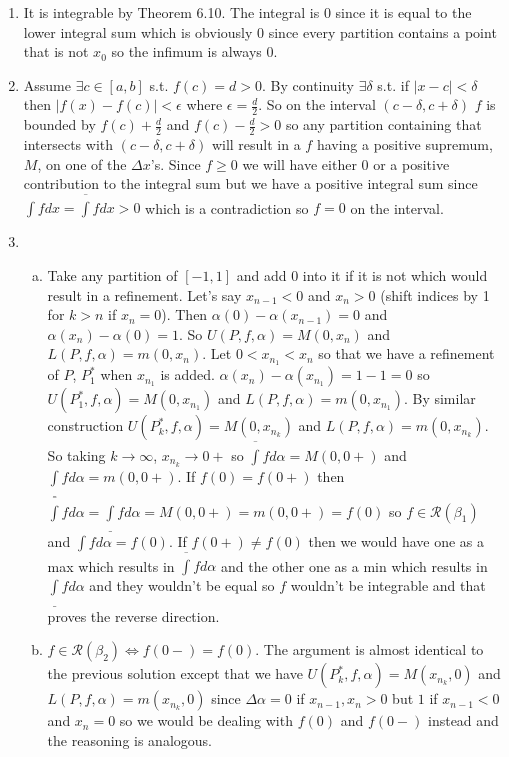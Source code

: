 \documentclass{article}
\begin{document}
\begin{enumerate}
\item It is integrable by Theorem 6.10. The integral is $0$ since it is equal to the lower integral sum which is obviously 0 since every partition contains a point that is not $x_0$ so the infimum is always $0$.
\item Assume $\exists c\in [a, b]$ s.t. $f(c) = d> 0$. By continuity $\exists \delta$ s.t. if $|x-c| < \delta$ then $|f(x)-f(c)| < \epsilon$ where $\epsilon = \frac{d}{2}$. So on the interval $(c-\delta, c+\delta)$ $f$ is bounded by $f(c)+\frac{d}{2}$ and $f(c)-\frac{d}{2} > 0$ so any partition containing that intersects with $(c-\delta, c+\delta)$ will result in a $f$ having a positive supremum, $M$, on one of the $\Delta x$'s. Since $f\geq 0$ we will have either $0$ or a positive contribution to the integral sum but we have a positive integral sum since $\int f dx=\overline{\int} f dx >0$ which is a contradiction so $f = 0$ on the interval. 
\item
\begin{enumerate}[(a)]
\item Take any partition of $[-1, 1]$ and add $0$ into it if it is not which would result in a refinement. Let's say $x_{n-1} < 0$ and $x_{n} >0$ (shift indices by 1  for $k > n$ if $x_{n} = 0$). Then $\alpha(0)-\alpha(x_{n-1}) = 0$ and $\alpha(x_{n}) - \alpha(0) = 1$. So $U(P, f, \alpha) = M(0, x_{n})$ and $L(P, f, \alpha) = m(0, x_{n})$. Let $0 < x_{n_{1}} < x_{n}$ so that we have a refinement of $P$, $P_{1}^*$ when $x_{n_{1}}$ is added. $\alpha(x_{n}) - \alpha(x_{n_{1}}) = 1-1=0$ so $U(P_{1}^*, f, \alpha) = M(0, x_{n_1})$ and $L(P, f, \alpha) = m(0, x_{n_1})$. By similar construction $U(P_{k}^*, f, \alpha) = M(0, x_{n_k})$ and $L(P, f, \alpha) = m(0, x_{n_k})$. So taking $k\rightarrow\infty$, $x_{n_k}\rightarrow 0+$ so $\overline{\int}f d\alpha = M(0, 0+)$ and $\underline{\int} f d\alpha = m(0, 0+)$. If $f(0)=f(0+)$ then $\overline{\int}f d\alpha=\underline{\int}f d\alpha=M(0, 0+) = m(0, 0+) = f(0)$ so $f\in\mathcal{R}(\beta_1)$ and $\int f d\alpha =f(0)$. If $f(0+) \neq f(0)$ then we would have one as a max which results in $\overline{\int}f d\alpha$ and the other one as a min which results in $\underline{\int} f d\alpha$ and they wouldn't be equal so $f$ wouldn't be integrable and that proves the reverse direction.\\
\item $f\in\mathcal{R}(\beta_2) \Leftrightarrow f(0-) = f(0)$. The argument is almost identical to the previous solution except that we have $U(P_{k}^*, f, \alpha) = M( x_{n_k}, 0)$ and $L(P, f, \alpha) = m( x_{n_k}, 0)$ since $\Delta \alpha = 0$ if $x_{n-1},x_{n} > 0$ but $1$ if $x_{n-1} < 0$ and $x_{n}=0$ so we would be dealing with $f(0)$ and $f(0-)$ instead and the reasoning is analogous.\\

\end{enumerate}
\end{enumerate}
\end{document}
